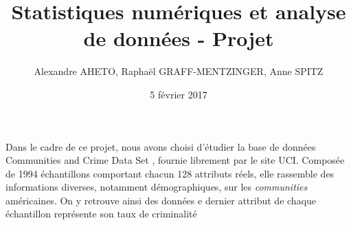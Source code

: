 \documentclass[a4paper,12pt]{article}
\title{Statistiques numériques et analyse de données - Projet}
\author{Alexandre AHETO, Raphaël GRAFF-MENTZINGER, Anne SPITZ}
\date{5 février 2017}
\begin{document}
 \maketitle

Dans le cadre de ce projet, nous avons choisi d'étudier la base de données \og Communities and Crime Data Set \fg{}, fournie librement par le site UCI. Composée de 1994 échantillons comportant chacun 128 attributs réels, elle rassemble des informations diverses, notamment démographiques, sur les \emph{communities} américaines. On y retrouve ainsi des données e dernier attribut de chaque échantillon représente son taux de criminalité 

 
\end{document}
